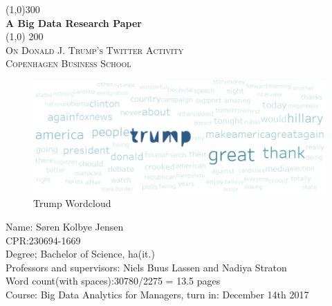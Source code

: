 \documentclass[12pt]{article}
\begin{document}
\begin{titlepage}
	\begin{center}
	\line(1,0){300} \\
	[0.25in]
	\color{NavyBlue} \huge{\bfseries A Big Data Research Paper } \\   
	[2mm]	
	\color{black}
	\line(1,0) {200} \\
	[0.1cm]
	\color{black}\textsc{\LARGE On Donald J. Trump's Twitter Activity} \\
	[0.75cm]
	\textsc{\LARGE Copenhagen Business School} \\
	[9.5cm]




\end{center}



\begin{figure}[H]
	\centering

%

\vspace*{-12cm} 
\includegraphics[scale=.75]{TrumpWord.PNG}



\caption{ Trump Wordcloud }
\vspace*{1.20cm} 


\end{figure}


	\begin{center}

	 Name: Søren Kolbye Jensen \\
	CPR:230694-1669\\
	Degree; Bachelor of Science, ha(it.) \\
	Professors and supervisors: Niels Buus Lassen and Nadiya Straton\\
	Word count(with spaces):30780/2275 = 13.5 pages \\
	Course: Big Data Analytics for Managers, turn in: December 14th 2017\\
	\end{center}





\end {titlepage}
\end{document}
